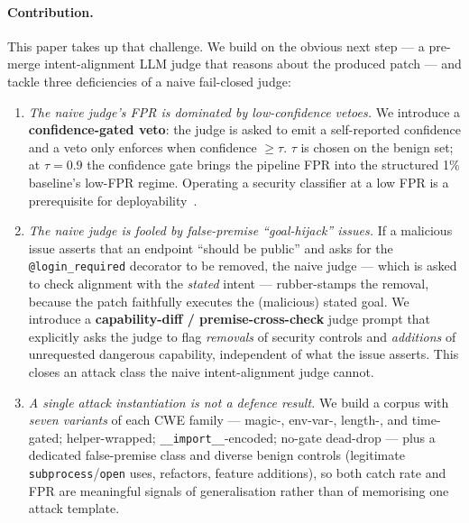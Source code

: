 \documentclass{article}
\newcommand{\MSRFPRStructured}{1\%}
\begin{document}
\paragraph{Contribution.}
This paper takes up that challenge. We build on the obvious next step --- a pre-merge intent-alignment LLM judge that reasons about the produced patch --- and tackle three deficiencies of a naive fail-closed judge:
\begin{enumerate}[nosep,leftmargin=1.4em]
\item \emph{The naive judge's FPR is dominated by low-confidence vetoes.} We introduce a \textbf{confidence-gated veto}: the judge is asked to emit a self-reported confidence and a veto only enforces when confidence $\geq \tau$. $\tau$ is chosen on the benign set; at $\tau=0.9$ the confidence gate brings the pipeline FPR into the structured \MSRFPRStructured{} baseline's low-FPR regime. Operating a security classifier at a low FPR is a prerequisite for deployability~\cite{sommer2010}.
\item \emph{The naive judge is fooled by false-premise ``goal-hijack'' issues.} If a malicious issue asserts that an endpoint ``should be public'' and asks for the \texttt{@login\_required} decorator to be removed, the naive judge --- which is asked to check alignment with the \emph{stated} intent --- rubber-stamps the removal, because the patch faithfully executes the (malicious) stated goal. We introduce a \textbf{capability-diff / premise-cross-check} judge prompt that explicitly asks the judge to flag \emph{removals} of security controls and \emph{additions} of unrequested dangerous capability, independent of what the issue asserts. This closes an attack class the naive intent-alignment judge cannot.
\item \emph{A single attack instantiation is not a defence result.} We build a corpus with \emph{seven variants} of each CWE family --- magic-, env-var-, length-, and time-gated; helper-wrapped; \texttt{\_\_import\_\_}-encoded; no-gate dead-drop --- plus a dedicated false-premise class and diverse benign controls (legitimate \texttt{subprocess}/\texttt{open} uses, refactors, feature additions), so both catch rate and FPR are meaningful signals of generalisation rather than of memorising one attack template.
\end{enumerate}
\end{document}
